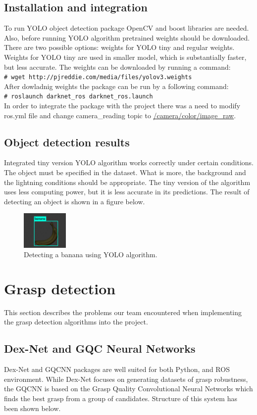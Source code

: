 \documentclass[conference,a4paper]{IEEEtran}
\newcommand{\shellcmd}[1]{\\\texttt{\footnotesize\# #1}\\}
\begin{document}
\subsection{Installation and integration}
To run YOLO object detection package OpenCV and boost libraries are needed. Also, before running YOLO algorithm pretrained weights should be downloaded. There are two possible options: weights for YOLO tiny and regular weights. Weights for YOLO tiny are used in smaller model, which is substantially faster, but less accurate. The weights can be downloaded by running a command:
\shellcmd{wget http://pjreddie.com/media/files/yolov3.weights}
After dowladnig weights the package can be run by a following command:
\shellcmd{roslaunch darknet\_ros darknet\_ros.launch}
In order to integrate the package with the project there was a need to modify ros.yml file and change camera\_reading topic to \url{/camera/color/image_raw}.

\subsection{Object detection results}
Integrated tiny version YOLO algorithm works correctly under certain conditions. The object must be specified in the dataset. What is more, the background and the lightning conditions should be appropriate. The tiny version of the algorithm uses less computing power, but it is less accurate in its predictions. The result of detecting an object is shown in a figure below. 

\begin{figure}[!ht]
  \centering
  \includegraphics[width=0.2\textwidth]{img/Yolo_banana.jpeg}
  \caption{Detecting a banana using YOLO algorithm.}
\end{figure}

\section{Grasp detection}
This section describes the problems our team encountered when implementing the grasp detection algorithms into the project.

\subsection{Dex-Net and GQC Neural Networks}
Dex-Net and GQCNN packages are well suited for both Python, and ROS environment. While Dex-Net focuses on generating datasets of grasp robustness, the GQCNN is based on the Grasp Quality Convolutional Neural Networks which finds the best grasp from a group of candidates. Structure of this system has been shown below.
\end{document}
